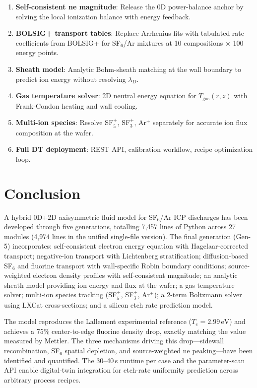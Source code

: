 \documentclass[11pt,a4paper]{article}
\newcommand{\Te}{T_e}
\newcommand{\eV}{\,\mathrm{eV}}
\begin{document}
\begin{enumerate}
\item \textbf{Self-consistent ne magnitude}: Release the 0D power-balance anchor by solving the local ionization balance with energy feedback.

\item \textbf{BOLSIG+ transport tables}: Replace Arrhenius fits with tabulated rate coefficients from BOLSIG+ for SF$_6$/Ar mixtures at 10 compositions $\times$ 100 energy points.

\item \textbf{Sheath model}: Analytic Bohm-sheath matching at the wall boundary to predict ion energy without resolving $\lambda_D$.

\item \textbf{Gas temperature solver}: 2D neutral energy equation for $T_{\mathrm{gas}}(r,z)$ with Frank-Condon heating and wall cooling.

\item \textbf{Multi-ion species}: Resolve SF$_5^+$, SF$_3^+$, Ar$^+$ separately for accurate ion flux composition at the wafer.

\item \textbf{Full DT deployment}: REST API, calibration workflow, recipe optimization loop.
\end{enumerate}

\section{Conclusion}
\label{sec:conclusion}

A hybrid 0D+2D axisymmetric fluid model for SF$_6$/Ar ICP discharges has been developed through five generations, totalling 7{,}457 lines of Python across 27 modules (4{,}974 lines in the unified single-file version).  The final generation (Gen-5) incorporates: self-consistent electron energy equation with Hagelaar-corrected transport; negative-ion transport with Lichtenberg stratification; diffusion-based SF$_6$ and fluorine transport with wall-specific Robin boundary conditions; source-weighted electron density profiles with self-consistent magnitude; an analytic sheath model providing ion energy and flux at the wafer; a gas temperature solver; multi-ion species tracking (SF$_5^+$, SF$_3^+$, Ar$^+$); a 2-term Boltzmann solver using LXCat cross-sections; and a silicon etch rate prediction model.

The model reproduces the Lallement experimental reference ($\Te = 2.99\eV$) and achieves a 75\% center-to-edge fluorine density drop, exactly matching the value measured by Mettler.  The three mechanisms driving this drop---sidewall recombination, SF$_6$ spatial depletion, and source-weighted ne peaking---have been identified and quantified.  The 30--40\,s runtime per case and the parameter-scan API enable digital-twin integration for etch-rate uniformity prediction across arbitrary process recipes.
\end{document}
